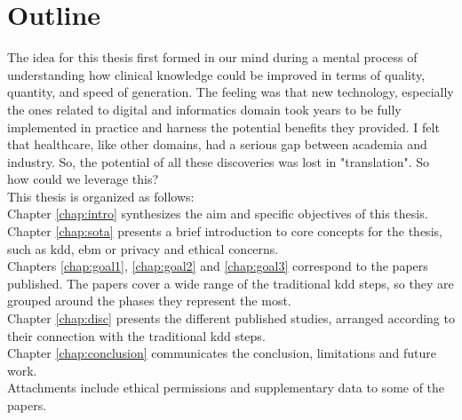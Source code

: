 \chapter*{Outline}


The idea for this thesis first formed in our mind during a mental process of understanding how clinical knowledge could be improved in terms of quality, quantity, and speed of generation. The feeling was that new technology, especially the ones related to digital and informatics domain took years to be fully implemented in practice and harness the potential benefits they provided. I felt that healthcare, like other domains, had a serious gap between academia and industry. So, the potential of all these discoveries was lost in "translation".
So how could we leverage this? \\
This thesis is organized as follows:\\
Chapter \ref{chap:intro} synthesizes the aim and specific objectives of this thesis.
Chapter \ref{chap:sota} presents a brief introduction to core concepts for the thesis, such as \ac{kdd}, \ac{ebm} or privacy and ethical concerns.\\
Chapters \ref{chap:goal1}, \ref{chap:goal2} and \ref{chap:goal3} correspond to the papers published. The papers cover a wide range of the traditional \ac{kdd} steps, so they are grouped around the phases they represent the most.\\

Chapter \ref{chap:disc}  presents the different published studies, arranged according to their connection with the traditional \ac{kdd} steps.\\

Chapter \ref{chap:conclusion} communicates the conclusion, limitations and future work.\\

Attachments include ethical permissions and supplementary data to some of the papers.

